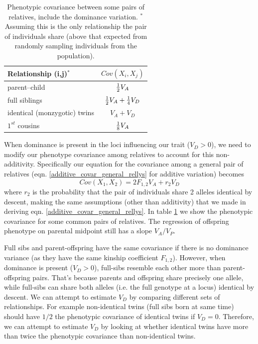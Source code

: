 \begin{table}
\begin{center}
\begin{tabular}{| l | c|}
\hline
Relationship (i,j)$^{*}$ &  $Cov(X_i,X_j)$  \\
\hline
parent--child & $\nicefrac{1}{2} V_A$\\
full siblings &$\nicefrac{1}{2} V_A +\nicefrac{1}{4} V_D$\\
identical (monzygotic) twins & $V_A+V_D$ \\
$1^{st}$ cousins & $\nicefrac{1}{8} V_A$\\
\hline
\end{tabular}
\end{center}
\caption{Phenotypic covariance between some pairs of relatives,
  include the dominance variation. $^{*}$Assuming this is the only relationship
the pair of individuals share (above that expected from randomly
sampling individuals from the population). } %
\label{table:domcovar}
\end{table}

When dominance is present in the loci influencing our trait ($V_D>0$), we need to modify our
phenotype covariance among relatives to account for this
non-additivity. Specifically our equation for the covariance among a
general pair of relatives
(eqn. \ref{additive_covar_general_rellys} for additive variation) becomes
\begin{equation}
 Cov(X_1,X_2) = 2 F_{1,2} V_A + r_2 V_D
\end{equation}
where $r_2$ is the probability that the pair of individuals share 2
alleles identical by descent, making the same assumptions (other than additivity) that we made in deriving
eqn. \ref{additive_covar_general_rellys}.  In table
\ref{table:domcovar} we show the phenotypic covariance for some common
pairs of relatives. The regression of offspring phenotype on parental
midpoint still has a slope $V_A/V_P$. 

Full sibs and parent-offspring have the same
covariance if there is no dominance variance (as they have the same
kinship coefficient $F_{1,2}$). However, when dominance
is present ($V_D>0$), full-sibs resemble each other more than
parent-offspring pairs. That's because parents and offspring share
precisely one allele, while full-sibs can share both alleles (i.e. the
full genotype at a locus) identical by descent. We can attempt to
estimate $V_D$ by comparing different sets of relationships. For
example non-identical twins (full sibs born at same time) 
should have $1/2$ the phenotypic covariance of identical twins if
$V_D=0$. Therefore, we can attempt to estimate $V_D$ by looking at
whether identical twins have more than twice the phenotypic covariance
than non-identical twins. \\


